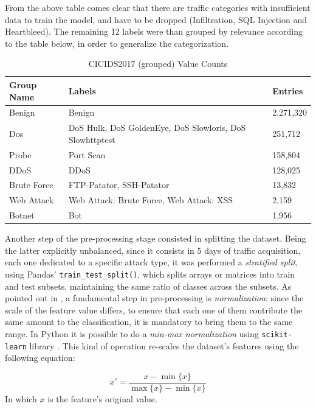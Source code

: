\noindent From the above table comes clear that there are traffic categories with insufficient data to train the model, and have to be dropped (Infiltration, SQL Injection and Heartbleed). The remaining 12 labels were than grouped by relevance according to the table below, in order to generalize the categorization.

\begin{table}[h]
    \centering
    \begin{tabular}{l|l|l}
        \toprule 
        Group Name & Labels & Entries \\
        \midrule
        \rowcolor{black!10} Benign & Benign & 2,271,320 \\
        Dos & DoS Hulk, DoS GoldenEye, DoS Slowloris, DoS Slowhttptest &  251,712 \\
        \rowcolor{black!10}Probe & Port Scan & 158,804 \\
        DDoS & DDoS & 128,025 \\
        \rowcolor{black!10}Brute Force & FTP-Patator, SSH-Patator  & 13,832 \\
        Web Attack & Web Attack: Brute Force, Web Attack: XSS & 2,159 \\
        \rowcolor{black!10}Botnet & Bot & 1,956 \\
        \bottomrule
    \end{tabular}
    \caption{CICIDS2017 (grouped) Value Counts}
    \label{tab:grouped-dataset-distribution}
\end{table}

\noindent Another step of the pre-processing stage consisted in splitting the dataset. Being the latter explicitly unbalanced, since it consists in 5 days of traffic acquisition, each one dedicated to a specific attack type, it was performed a \textit{stratified split}, using Pandas' \texttt{train\_test\_split()}, which splits arrays or matrices into train and test subsets, maintaining the same ratio of classes across the subsets. As pointed out in \cite{Mozley2020}, a fundamental step in pre-processing is \textit{normalization}: since the scale of the feature value differs, to ensure that each one of them contribute the same amount to the classification, it is mandatory to bring them to the same range. In Python it is possible to do a \textit{min-max normalization} using \texttt{scikit-learn} library \cite{ScikitWebsite}. This kind of operation re-scales the dataset's features using the following equation:

\begin{equation}
    x\prime=\frac{x-\min\{x\}}{\max\{x\}-\min\{x\}}
\end{equation}
In which $x$ is the feature's original value.

